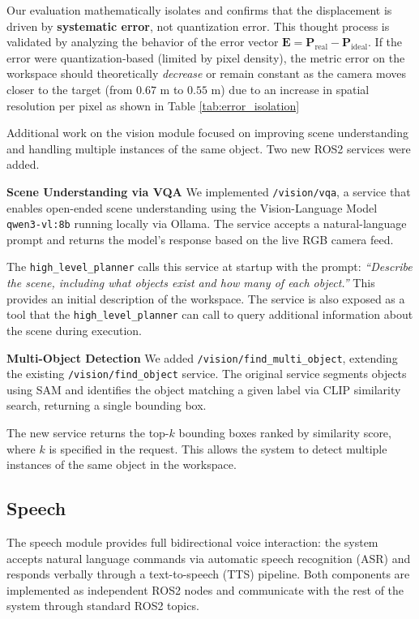 \documentclass[12pt]{extarticle}
\begin{document}
Our evaluation mathematically isolates and confirms that the displacement is driven by \textbf{systematic error}, not quantization error. This thought process is validated by analyzing the behavior of the error vector $\mathbf{E} = \mathbf{P}_{\text{real}} - \mathbf{P}_{\text{ideal}}$. If the error were quantization-based (limited by pixel density), the metric error on the workspace should theoretically \textit{decrease} or remain constant as the camera moves closer to the target (from $0.67\text{ m}$ to $0.55\text{ m}$) due to an increase in spatial resolution per pixel as shown in Table \ref{tab:error_isolation}

Additional work on the vision module focused on improving scene understanding and handling multiple instances of the same object. Two new ROS2 services were added.

\textbf{Scene Understanding via VQA}
We implemented \texttt{/vision/vqa}, a service that enables open-ended scene understanding using the Vision-Language Model \texttt{qwen3-vl:8b} running locally via Ollama. The service accepts a natural-language prompt and returns the model’s response based on the live RGB camera feed.

The \texttt{high\_level\_planner} calls this service at startup with the prompt: \textit{“Describe the scene, including what objects exist and how many of each object.”} This provides an initial description of the workspace. The service is also exposed as a tool that the \texttt{high\_level\_planner} can call to query additional information about the scene during execution.

\textbf{Multi-Object Detection}
We added \texttt{/vision/find\_multi\_object}, extending the existing \texttt{/vision/find\_object} service. The original service segments objects using SAM and identifies the object matching a given label via CLIP similarity search, returning a single bounding box.

The new service returns the top-$k$ bounding boxes ranked by similarity score, where $k$ is specified in the request. This allows the system to detect multiple instances of the same object in the workspace.

\subsection{Speech}

The speech module provides full bidirectional voice interaction: the system accepts natural language commands via automatic speech recognition (ASR) and responds verbally through a text-to-speech (TTS) pipeline. Both components are implemented as independent ROS2 nodes and communicate with the rest of the system through standard ROS2 topics.
\end{document}
